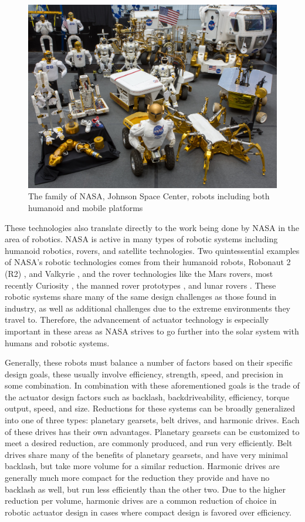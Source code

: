 \begin{figure}[!b]
   \centering
   \includegraphics[width=0.7\linewidth]{fig/robot_collage}
   \caption{The family of NASA, Johnson Space Center, robots including both humanoid and mobile platforms}
   \label{fig/robot_collage}
\end{figure}

These technologies also translate directly to the work being done by NASA in the area of robotics. 
NASA is active in many types of robotic systems including humanoid robotics, rovers, and satellite technologies. 
Two quintessential examples of NASA's robotic technologies comes from their humanoid robots, Robonaut 2 (R2) \cite{ref:r2}, and Valkyrie \cite{ref:valkyrie}, and the rover technologies like the Mars rovers, most recently Curiosity \cite{ref:curiosity}, the manned rover prototypes \cite{ref:rover}, and lunar rovers \cite{ref:RP}.
These robotic systems share many of the same design challenges as those found in industry, as well as additional challenges due to the extreme environments they travel to. Therefore, the advancement of actuator technology is especially important in these areas as NASA strives to go further into the solar system with humans and robotic systems. 

Generally, these robots must balance a number of factors based on their specific design goals, these usually involve efficiency, strength, speed, and precision in some combination. 
In combination with these aforementioned goals is the trade of the actuator design factors such as backlash, backdriveability, efficiency, torque output, speed, and size. 
Reductions for these systems can be broadly generalized into one of three types: planetary gearsets, belt drives, and harmonic drives. 
Each of these drives has their own advantages. 
Planetary gearsets can be customized to meet a desired reduction, are commonly produced, and run very efficiently.
Belt drives share many of the benefits of planetary gearsets, and have very minimal backlash, but take more volume for a similar reduction. 
Harmonic drives are generally much more compact for the reduction they provide and have no backlash as well, but run less efficiently than the other two. 
Due to the higher reduction per volume, harmonic drives are a common reduction of choice in robotic actuator design in cases where compact design is favored over efficiency.

